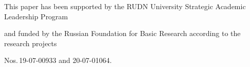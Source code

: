 




















\Ack


\noindent


This paper has been supported by the RUDN University Strategic Academic Leadership Program 


and funded by the Russian Foundation for Basic Research according to the research projects 


Nos.\,19-07-00933 and 20-07-01064. 













\renewcommand{\bibname}{\protect\rmfamily References}







